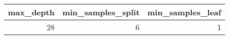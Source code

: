 \begin{tabular}{rrr}
\toprule
max_depth & min_samples_split & min_samples_leaf \\
\midrule
28 & 6 & 1 \\
\bottomrule
\end{tabular}

